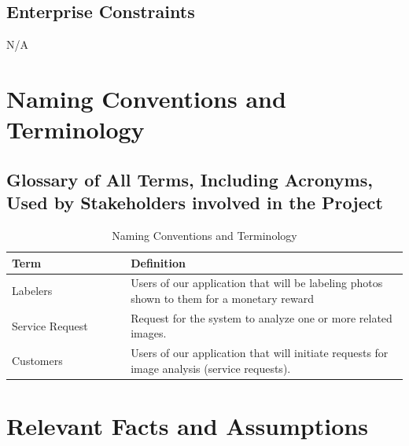 \documentclass[12pt]{article}
\begin{document}
\subsection{Enterprise Constraints}
N/A
\newpage
\section{Naming Conventions and Terminology}
\subsection{Glossary of All Terms, Including Acronyms, Used by Stakeholders
involved in the Project}
\begin{table}[H]
    \centering
    \begin{tabular}{|p{0.3\linewidth} | p{0.7\linewidth}| }
    \hline
    \textbf{Term} & \textbf{Definition}\\
    \hline
    Labelers & Users of our application that will be labeling photos shown to them for a monetary reward\\
    \hline
    Service Request & Request for the system to analyze one or more related images.\\
    \hline
    Customers & Users of our application that will initiate requests for image analysis (service requests).\\
    \hline
    \end{tabular}
    \caption{Naming Conventions and Terminology}
\end{table}
\newpage
\section{Relevant Facts and Assumptions}
\end{document}
